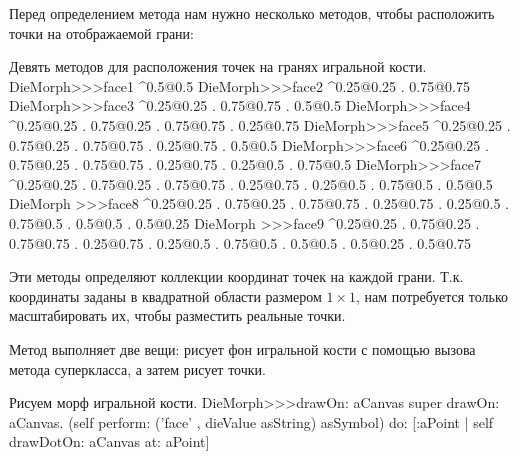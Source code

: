 \documentclass[a4paper,10pt,twoside]{book}
\begin{document}
Перед определением метода  нам нужно несколько методов, чтобы расположить точки на отображаемой грани:
\begin{methods}{Девять методов для расположения точек на гранях игральной кости.}
DieMorph>>>face1
	^{0.5@0.5}
DieMorph>>>face2
	^{0.25@0.25 . 0.75@0.75}
DieMorph>>>face3
	^{0.25@0.25 . 0.75@0.75 . 0.5@0.5}
DieMorph>>>face4
	^{0.25@0.25 . 0.75@0.25 . 0.75@0.75 . 0.25@0.75}
DieMorph>>>face5
	^{0.25@0.25 . 0.75@0.25 . 0.75@0.75 . 0.25@0.75 . 0.5@0.5}
DieMorph>>>face6
	^{0.25@0.25 . 0.75@0.25 . 0.75@0.75 . 0.25@0.75 . 0.25@0.5 . 0.75@0.5}
DieMorph>>>face7
	^{0.25@0.25 . 0.75@0.25 . 0.75@0.75 . 0.25@0.75 . 0.25@0.5 . 0.75@0.5 . 0.5@0.5}
DieMorph >>>face8
	^{0.25@0.25 . 0.75@0.25 . 0.75@0.75 . 0.25@0.75 . 0.25@0.5 . 0.75@0.5 . 0.5@0.5 . 0.5@0.25}
DieMorph >>>face9
	^{0.25@0.25 . 0.75@0.25 . 0.75@0.75 . 0.25@0.75 . 0.25@0.5 . 0.75@0.5 . 0.5@0.5 . 0.5@0.25 . 0.5@0.75}
\end{methods}

Эти методы определяют коллекции координат точек на каждой грани. Т.к. координаты заданы в квадратной области размером $1\times1$, нам потребуется только масштабировать их, чтобы разместить реальные точки.

Метод  выполняет две вещи: рисует фон игральной кости с помощью вызова метода суперкласса, а затем рисует точки.
\begin{method}{Рисуем морф игральной кости.}
DieMorph>>>drawOn: aCanvas
	super drawOn: aCanvas.
	(self perform: ('face' , dieValue asString) asSymbol)
		do: [:aPoint | self drawDotOn: aCanvas at: aPoint]
\end{method}
\end{document}
